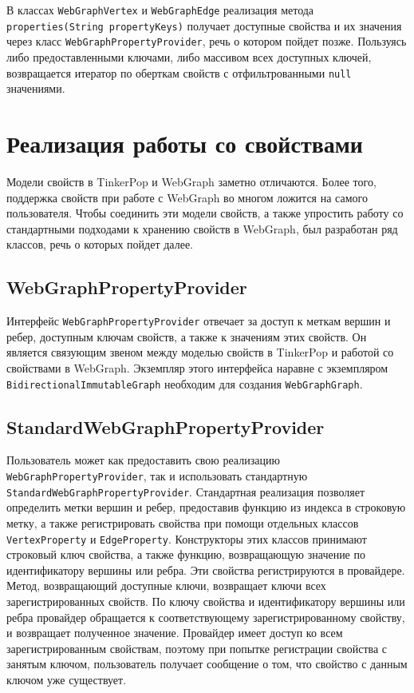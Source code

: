 \documentclass[times,specification,annotation]{itmo-student-thesis}
\begin{document}
В классах \texttt{WebGraphVertex} и \texttt{WebGraphEdge} реализация метода \texttt{properties(String propertyKeys)} получает доступные свойства и их значения через класс \texttt{WebGraphPropertyProvider}, речь о котором пойдет позже. Пользуясь либо предоставленными ключами, либо массивом всех доступных ключей, возвращается итератор по оберткам свойств с отфильтрованными \texttt{null} значениями.

\section{Реализация работы со свойствами}

Модели свойств в TinkerPop и WebGraph заметно отличаются. Более того, поддержка свойств при работе с WebGraph во многом ложится на самого пользователя. Чтобы соединить эти модели свойств, а также упростить работу со стандартными подходами к хранению свойств в WebGraph, был разработан ряд классов, речь о которых пойдет далее.

\subsection{WebGraphPropertyProvider}

Интерфейс \texttt{WebGraphPropertyProvider} отвечает за доступ к меткам вершин и ребер, доступным ключам свойств, а также к значениям этих свойств. Он является связующим звеном между моделью свойств в TinkerPop и работой со свойствами в WebGraph. Экземпляр этого интерфейса наравне с экземпляром \texttt{BidirectionalImmutableGraph} необходим для создания \texttt{WebGraphGraph}.

\subsection{StandardWebGraphPropertyProvider}

Пользователь может как предоставить свою реализацию \texttt{WebGraphPropertyProvider}, так и использовать стандартную \texttt{StandardWebGraphPropertyProvider}. Стандартная реализация позволяет определить метки вершин и ребер, предоставив функцию из индекса в строковую метку, а также регистрировать свойства при помощи отдельных классов \texttt{VertexProperty} и \texttt{EdgeProperty}. Конструкторы этих классов принимают строковый ключ свойства, а также функцию, возвращающую значение по идентификатору вершины или ребра.
Эти свойства регистрируются в провайдере. Метод, возвращающий доступные ключи, возвращает ключи всех зарегистрированных свойств. По ключу свойства и идентификатору вершины или ребра провайдер обращается к соответствующему зарегистрированному свойству, и возвращает полученное значение. Провайдер имеет доступ ко всем зарегистрированным свойствам, поэтому при попытке регистрации свойства с занятым ключом, пользователь получает сообщение о том, что свойство с данным ключом уже существует.
\end{document}
